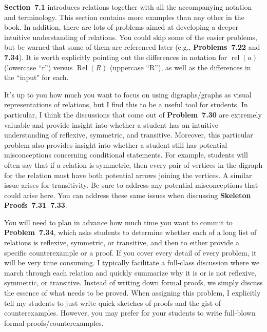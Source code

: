 \documentclass[11pt]{article}%
\newcommand{\blankline}{\pagebreak[2]\vspace{.5\baselineskip}}
\DeclareMathOperator{\rel}{rel}
\DeclareMathOperator{\Rel}{Rel}
\begin{document}
\blankline

\textbf{Section~7.1} introduces relations together with all the accompanying notation and terminology. This section contains more examples than any other in the book.  In addition, there are lots of problems aimed at developing a deeper intuitive understanding of relations.  You could skip some of the easier problems, but be warned that some of them are referenced later (e.g., \textbf{Problems~7.22} and \textbf{7.34}).  It is worth explicitly pointing out the differences in notation for $\rel(a)$ (lowercase ``r'') versus $\Rel(R)$ (uppercase ``R''), as well as the differences in the ``input" for each.

\blankline

It's up to you how much you want to focus on using digraphs/graphs as visual representations of relations, but I find this to be a useful tool for students. In particular, I think the discussions that come out of \textbf{Problem~7.30} are extremely valuable and provide insight into whether a student has an intuitive understanding of reflexive, symmetric, and transitive.  Moreover, this particular problem also provides insight into whether a student still has potential misconceptions concerning conditional statements.  For example, students will often say that if a relation is symmetric, then every pair of vertices in the digraph for the relation must have both potential arrows joining the vertices. A similar issue arises for transitivity. Be sure to address any potential misconceptions that could arise here. You can address these same issues when discussing \textbf{Skeleton Proofs~7.31--7.33}.

\blankline

You will need to plan in advance how much time you want to commit to \textbf{Problem~7.34}, which asks students to determine whether each of a long list of relations is reflexive, symmetric, or transitive, and then to either provide a specific counterexample or a proof.  If you cover every detail of every problem, it will be very time consuming.  I typically facilitate a full-class discussion where we march through each relation and quickly summarize why it is or is not reflexive, symmetric, or transitive.  Instead of writing down formal proofs, we simply discuss the essence of what needs to be proved.  When assigning this problem, I explicitly tell my students to just write quick sketches of proofs and the gist of counterexamples.  However, you may prefer for your students to write full-blown formal proofs/counterexamples. 
\end{document}
